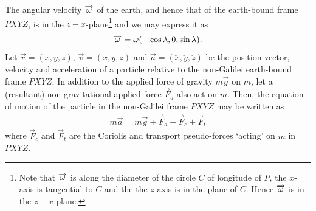 The angular velocity $\overrightarrow{{\omega}}$ of the earth, and hence 
that of the earth-bound frame $PXYZ $, is in the 
$z-x$-plane\footnote{Note that $\overrightarrow{{\omega}}$ is along the 
diameter of the circle $C$ of longitude of $P$, the 
$x$-axis 
is tangential to $C$ and the the $z$-axis is in the plane 
of 
$C$. Hence $\overrightarrow{{\omega}}$ is in the $z-x$ plane.} and we may 
express it as
\begin{align}
\overrightarrow{{\omega}}={\omega}(-\cos\lambda, 0,\sin\lambda).
\end{align}
Let $\vec{r} =(x,y,z)$, $\vec{v} 
=(\dot{x},\dot{y},\dot{z})$ 
and $\vec{a} =(\ddot{x},\ddot{y},\ddot{z})$ be the position 
vector, velocity and acceleration of a particle relative to 
the non-Galilei earth-bound frame $PXYZ$. In addition to 
the 
applied force of gravity $ m\vec{g}$ on $m$, let a 
(resultant) non-gravitational applied force $\vec{F}_a $ 
also 
act on $m$. Then, the equation of motion of the particle in 
the non-Galilei frame $PXYZ $ may be written as 
\begin{align}\label{nif.57} m \vec{a}= m\vec{g}+\vec{F}_a 
+\vec{F}_c +\vec{F}_t \end{align} where $\vec{F}_c $ and 
$\vec{F}_t $ are the Coriolis and transport pseudo-forces 
`acting' on $m$ in $PXYZ $.

